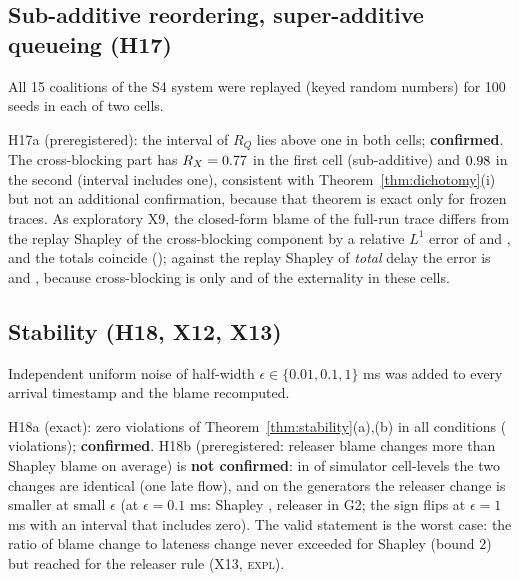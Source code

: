 \documentclass[11pt]{article}
\newcommand{\tagC}{\textsc{conf}}
\newcommand{\tagE}{\textsc{expl}}
\theoremstyle{definition}
\begin{document}
\subsection{Sub-additive reordering, super-additive queueing (H17)}\label{sec:val-dich}
All 15 coalitions of the S4 system were replayed (keyed random numbers) for 100 seeds in each of two cells.
\begin{table}[h]
\centering\small

\caption{H17 (\tagC{} for $R_Q$; $R_X$ is \tagE{}): non-additivity ratios of Theorem~\ref{thm:dichotomy}(iii), interventional replay, seed-cluster intervals. The identity of Theorem~\ref{thm:dichotomy}(iii) holds to rounding; the coalition identity gap is at most \FvIdGapB{} and replay-signature violations are \FvSigA{}.}
\end{table}
H17a (preregistered): the interval of $R_Q$ lies above one in both cells; \textbf{confirmed}. The cross-blocking part has $R_X=0.77{}$ \FvRXACI{} in the first cell (sub-additive) and $0.98{}$ \FvRXBCI{} in the second (interval includes one), consistent with Theorem~\ref{thm:dichotomy}(i) but not an additional confirmation, because that theorem is exact only for frozen traces. As exploratory X9, the closed-form blame of the full-run trace differs from the replay Shapley of the cross-blocking component by a relative $L^1$ error of \FvNineErrA{} \FvNineErrACI{} and \FvNineErrB{} \FvNineErrBCI{}, and the totals coincide (\FvNineTotA{}); against the replay Shapley of \emph{total} delay the error is \FvNineEA{} and \FvNineEB{}, because cross-blocking is only \FvShareXA{} and \FvShareXB{} of the externality in these cells.

\subsection{Stability (H18, X12, X13)}\label{sec:stab}
Independent uniform noise of half-width $\epsilon\in\{0.01,0.1,1\}$ ms was added to every arrival timestamp and the blame recomputed.
\begin{table}[h]
\centering\footnotesize

\caption{Stability (H18 cells C1--C3 at $\epsilon=0.1$ ms and exploratory X12 cells C5, G2, G3). Mean $L^1$ change of the per-packet blame vector over blocked packets; maximum over packets of (change of blame)/($L^1$ change of lateness).}
\end{table}
H18a (exact): zero violations of Theorem~\ref{thm:stability}(a),(b) in all conditions (\FvBoundViol{} violations); \textbf{confirmed}. H18b (preregistered: releaser blame changes more than Shapley blame on average) is \textbf{not confirmed}: in \FvStabTies{} of \FvStabCells{} simulator cell-levels the two changes are identical (one late flow), and on the generators the releaser change is smaller at small $\epsilon$ (at $\epsilon=0.1$ ms: Shapley \FvStabGtwoSh{}, releaser \FvStabGtwoRel{} in G2; the sign flips at $\epsilon=1$ ms with an interval that includes zero). The valid statement is the worst case: the ratio of blame change to lateness change never exceeded \FvRatioSh{} for Shapley (bound $2$) but reached \FvRatioRel{} for the releaser rule (X13, \tagE{}).
\end{document}
